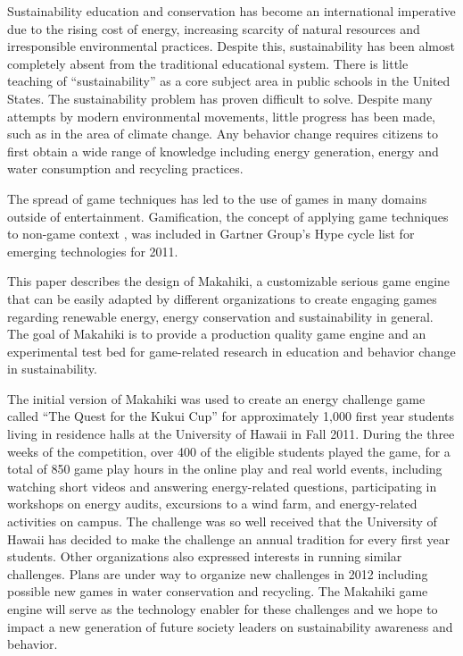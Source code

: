 \documentclass{acm_proc_article-sp}
\begin{document}
Sustainability education and conservation has become an international imperative due to the rising cost of energy, increasing scarcity of natural resources and irresponsible environmental practices. Despite this, sustainability has been almost completely absent from the traditional educational system. There is little teaching of ``sustainability'' as a core subject area in public schools in the United States. The sustainability problem has proven difficult to solve. Despite many attempts by modern environmental movements, little progress has been made, such as in the area of climate change. Any behavior change requires citizens to first obtain a wide range of knowledge including energy generation, energy and water consumption and recycling practices. 

The spread of game techniques has led to the use of games in many domains outside of entertainment. Gamification, the concept of applying game techniques to non-game context \cite{Deterding2011mt}, was included in Gartner Group's Hype cycle list for emerging technologies for 2011. 

This paper describes the design of Makahiki, a customizable serious game engine that  can be easily adapted by different organizations to create engaging games regarding renewable energy, energy conservation and sustainability in general.  The goal of Makahiki is to provide a production quality game engine and an experimental test bed for game-related research in education and behavior change in sustainability.

The initial version of Makahiki was used to create an energy challenge game called ``The Quest for the Kukui Cup'' \cite{csdl2-11-02, csdl2-10-07} for approximately 1,000 first year students living in residence halls at the University of Hawaii in Fall 2011. During the three weeks of the competition, over 400 of the eligible students played the game, for a total of 850 game play hours in the online play and real world events, including watching short videos and answering energy-related questions, participating in workshops on energy audits, excursions to a wind farm, and energy-related activities on campus. The challenge was so well received that the University of Hawaii has decided to make the challenge an annual tradition for every first year students. Other organizations also expressed interests in running similar challenges. Plans are under way to organize new challenges in 2012 including possible new games in water conservation and recycling. The Makahiki game engine will serve as the technology enabler for these challenges and we hope to impact a new generation of future society leaders on sustainability awareness and behavior.
\end{document}
